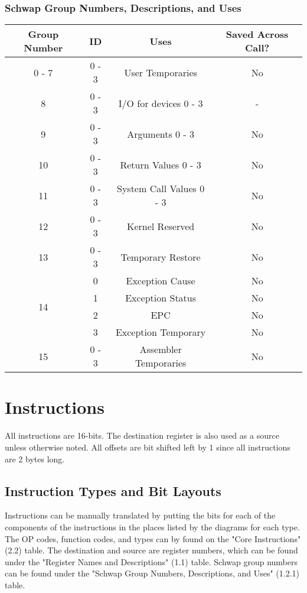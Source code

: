 \documentclass{article}
\begin{document}
		\subsubsection{Schwap Group Numbers, Descriptions, and Uses}
			\begin{center}
				\begin{tabular}{| c | c | c | c |}
					\hline
				    	Group Number   & ID    & Uses                     & Saved Across Call? \\ \hline
					    0 - 7          & 0 - 3 & User Temporaries         & No \\ \hline
					    8              & 0 - 3 & I/O for devices 0 - 3    & -  \\ \hline
					    9              & 0 - 3 & Arguments 0 - 3          & No \\ \hline
					    10             & 0 - 3 & Return Values 0 - 3      & No \\ \hline
					    11             & 0 - 3 & System Call Values 0 - 3 & No \\ \hline
				    	12             & 0 - 3 & Kernel Reserved          & No \\ \hline
					    13             & 0 - 3 & Temporary Restore        & No \\ \hline 
					    \multirow{4}{*}{14} & 0 & Exception Cause         & No \\
					    			   & 1     & Exception Status         & No \\
								       & 2     & EPC                      & No \\
								       & 3     & Exception Temporary      & No \\ \hline
					    15             & 0 - 3 & Assembler Temporaries    & No \\
					\hline
				\end{tabular}
			\end{center}
\newpage
\section{Instructions}
	All instructions are 16-bits.  The destination register is also used as a source unless otherwise noted.  All offsets are bit shifted left by 1 since all instructions are 2 bytes long. 
	\subsection{Instruction Types and Bit Layouts}
		Instructions can be manually translated by putting the bits for each of the components of the instructions in the places listed by the diagrams for each type.  The OP codes, function codes, and types can by found on the "Core Instructions" (2.2) table.  The destination and source are register numbers, which can be found under the "Register Names and Descriptions" (1.1) table.  Schwap group numbers can be found under the "Schwap Group Numbers, Descriptions, and Uses" (1.2.1) table.
\end{document}

